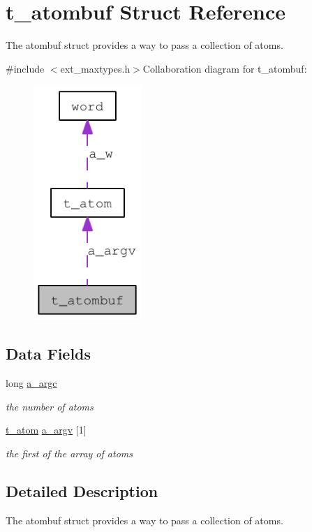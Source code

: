 \hypertarget{structt__atombuf}{
\section{t\_\-atombuf Struct Reference}
\label{structt__atombuf}
}


The atombuf struct provides a way to pass a collection of atoms.  


{\ttfamily \#include $<$ext\_\-maxtypes.h$>$}Collaboration diagram for t\_\-atombuf:\nopagebreak
\begin{figure}[H]
\begin{center}
\leavevmode
\includegraphics[width=116pt]{structt__atombuf__coll__graph}
\end{center}
\end{figure}
\subsection*{Data Fields}
\begin{DoxyCompactItemize}
\item 
\hypertarget{structt__atombuf_a10cd45d77731a9d19a5797229a11ef07}{
long \hyperlink{structt__atombuf_a10cd45d77731a9d19a5797229a11ef07}{a\_\-argc}}
\label{structt__atombuf_a10cd45d77731a9d19a5797229a11ef07}

\begin{DoxyCompactList}\small\item\em the number of atoms \item\end{DoxyCompactList}\item 
\hypertarget{structt__atombuf_afcee8d49c0cdaa83cd14c4c2dff44be6}{
\hyperlink{structt__atom}{t\_\-atom} \hyperlink{structt__atombuf_afcee8d49c0cdaa83cd14c4c2dff44be6}{a\_\-argv} \mbox{[}1\mbox{]}}
\label{structt__atombuf_afcee8d49c0cdaa83cd14c4c2dff44be6}

\begin{DoxyCompactList}\small\item\em the first of the array of atoms \item\end{DoxyCompactList}\end{DoxyCompactItemize}


\subsection{Detailed Description}
The atombuf struct provides a way to pass a collection of atoms. 